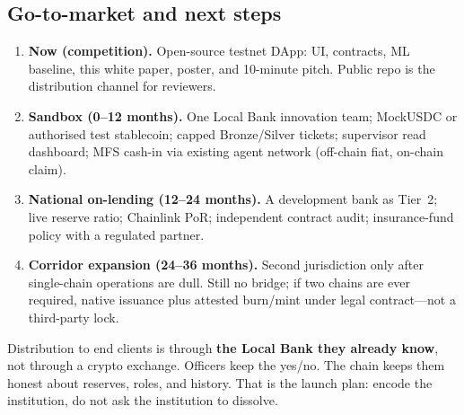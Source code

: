 \documentclass[11pt,a4paper]{article}
\begin{document}
\subsection{Go-to-market and next steps}

\begin{enumerate}
  \item \textbf{Now (competition).} Open-source testnet DApp: UI, contracts, ML baseline, this white paper, poster, and 10-minute pitch. Public repo is the distribution channel for reviewers.
  \item \textbf{Sandbox (0--12 months).} One Local Bank innovation team; MockUSDC or authorised test stablecoin; capped Bronze/Silver tickets; supervisor read dashboard; MFS cash-in via existing agent network (off-chain fiat, on-chain claim).
  \item \textbf{National on-lending (12--24 months).} A development bank as Tier~2; live reserve ratio; Chainlink PoR; independent contract audit; insurance-fund policy with a regulated partner.
  \item \textbf{Corridor expansion (24--36 months).} Second jurisdiction only after single-chain operations are dull. Still no bridge; if two chains are ever required, native issuance plus attested burn/mint under legal contract---not a third-party lock.
\end{enumerate}

Distribution to end clients is through \textbf{the Local Bank they already know}, not through a crypto exchange. Officers keep the yes/no. The chain keeps them honest about reserves, roles, and history. That is the launch plan: encode the institution, do not ask the institution to dissolve.

\end{document}
